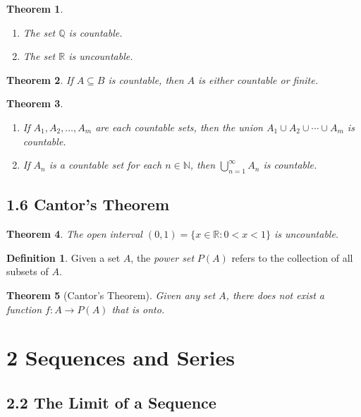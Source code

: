 \documentclass{amsart}
\newtheorem*{theorem}{Theorem}
\theoremstyle{definition}
\newtheorem*{definition}{Definition}
\newcommand{\N}{\mathbb{N}}
\newcommand{\Q}{\mathbb{Q}}
\newcommand{\R}{\mathbb{R}}
\newcommand{\st}{\mathrel{:}}
\begin{document}
\begin{theorem}
  \begin{enumerate}[label={(\roman*)}]
    \item The set $\Q$ is countable.
    \item The set $\R$ is uncountable.
  \end{enumerate}
\end{theorem}

\begin{theorem}
  If $A \subseteq B$ is countable, then $A$ is either countable or finite.
\end{theorem}

\begin{theorem}
  \begin{enumerate}[label={(\roman*)}]
    \item If $A_1, A_2, \ldots, A_m$ are each countable sets, then the union
      $A_1 \cup A_2 \cup \cdots \cup A_m$ is countable.
    \item If $A_n$ is a countable set for each $n \in \N$, then
      $\bigcup_{n=1}^{\infty} A_n$ is countable.
  \end{enumerate}
\end{theorem}

\subsection*{1.6 Cantor's Theorem}

\begin{theorem}
  The open interval $(0, 1) = \{x \in \R \st 0 < x < 1\}$ is uncountable.
\end{theorem}

\begin{definition}
  Given a set $A$, the \emph{power set} $P(A)$ refers to the collection of all
  subsets of $A$.
\end{definition}

\begin{theorem}[Cantor's Theorem]
  Given any set $A$, there does not exist a function $f : A \rightarrow P(A)$
  that is onto.
\end{theorem}

\section*{2 Sequences and Series}

\subsection*{2.2 The Limit of a Sequence}
\end{document}
